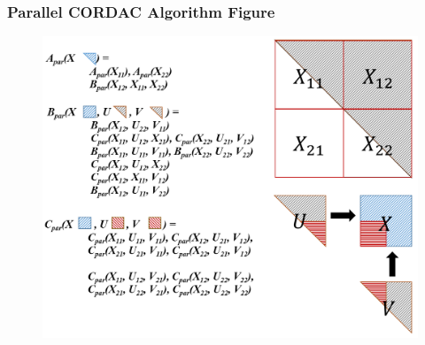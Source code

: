 \begin{frame}
    \frametitle{Parallel CORDAC Algorithm Figure}
    \begin{figure}
        \includegraphics[scale=0.25]{figure/fig-par-explain.png}
    \end{figure}
\end{frame}

